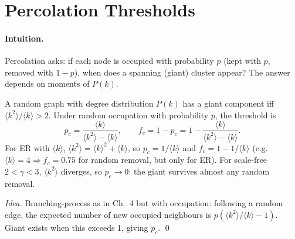 \section{Percolation Thresholds}
\label{sec:percolation}
\paragraph{Intuition.} Percolation asks: if each node is occupied with probability $p$ (kept with $p$, removed with $1-p$), when does a spanning (giant) cluster appear? The answer depends on moments of $P(k)$.

\begin{theorem}\label{thm:percolation}
A random graph with degree distribution $P(k)$ has a giant component iff $\langle k^2\rangle/\langle k\rangle>2$. Under random occupation with probability $p$, the threshold is
\begin{equation}
p_c=\frac{\langle k\rangle}{\langle k^2\rangle-\langle k\rangle},\qquad
f_c=1-p_c=1-\frac{\langle k\rangle}{\langle k^2\rangle-\langle k\rangle}.
\end{equation}
For ER with $\langle k\rangle$, $\langle k^2\rangle=\langle k\rangle^2+\langle k\rangle$, so $p_c=1/\langle k\rangle$ and $f_c=1-1/\langle k\rangle$ (e.g.\ $\langle k\rangle=4\Rightarrow f_c=0.75$ for random removal, but only for ER). For scale-free $2<\gamma<3$, $\langle k^2\rangle$ diverges, so $p_c\to0$: the giant survives almost any random removal.
\end{theorem}
\begin{proof}[Idea]
Branching-process as in Ch.~4 but with occupation: following a random edge, the expected number of new occupied neighbours is $p(\langle k^2\rangle/\langle k\rangle-1)$. Giant exists when this exceeds 1, giving $p_c$. \qed
\end{proof}

